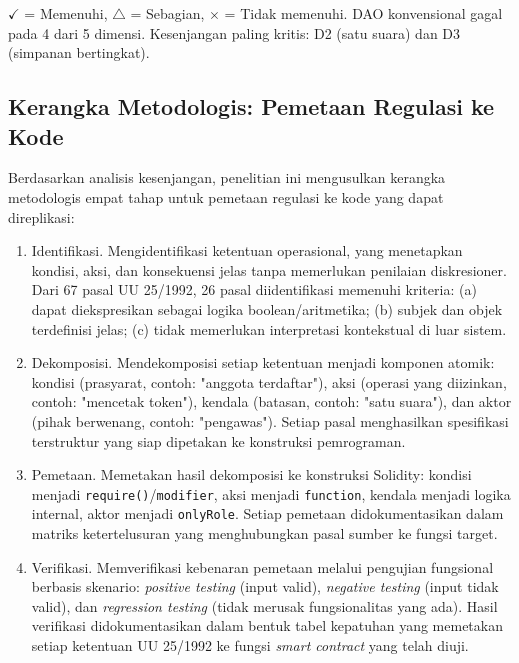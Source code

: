 \noindent $\checkmark$ = Memenuhi, $\triangle$ = Sebagian, $\times$ = Tidak memenuhi. DAO konvensional gagal pada 4 dari 5 dimensi. Kesenjangan paling kritis: D2 (satu suara) dan D3 (simpanan bertingkat).

\subsection{Kerangka Metodologis: Pemetaan Regulasi ke Kode}

Berdasarkan analisis kesenjangan, penelitian ini mengusulkan kerangka metodologis empat tahap untuk pemetaan regulasi ke kode yang dapat direplikasi:

\begin{enumerate}
	\item Identifikasi. Mengidentifikasi ketentuan operasional, yang menetapkan kondisi, aksi, dan konsekuensi jelas tanpa memerlukan penilaian diskresioner. Dari 67 pasal UU 25/1992, 26 pasal diidentifikasi memenuhi kriteria: (a) dapat diekspresikan sebagai logika boolean/aritmetika; (b) subjek dan objek terdefinisi jelas; (c) tidak memerlukan interpretasi kontekstual di luar sistem.
	
	\item Dekomposisi. Mendekomposisi setiap ketentuan menjadi komponen atomik: kondisi (prasyarat, contoh: "anggota terdaftar"), aksi (operasi yang diizinkan, contoh: "mencetak token"), kendala (batasan, contoh: "satu suara"), dan aktor (pihak berwenang, contoh: "pengawas"). Setiap pasal menghasilkan spesifikasi terstruktur yang siap dipetakan ke konstruksi pemrograman.
	
	\item Pemetaan. Memetakan hasil dekomposisi ke konstruksi Solidity: kondisi menjadi \texttt{require()}/\texttt{modifier}, aksi menjadi \texttt{function}, kendala menjadi logika internal, aktor menjadi \texttt{onlyRole}. Setiap pemetaan didokumentasikan dalam matriks ketertelusuran yang menghubungkan pasal sumber ke fungsi target.
	
	\item Verifikasi. Memverifikasi kebenaran pemetaan melalui pengujian fungsional berbasis skenario: \textit{positive testing} (input valid), \textit{negative testing} (input tidak valid), dan \textit{regression testing} (tidak merusak fungsionalitas yang ada). Hasil verifikasi didokumentasikan dalam bentuk tabel kepatuhan yang memetakan setiap ketentuan UU 25/1992 ke fungsi \textit{smart contract} yang telah diuji.
\end{enumerate}

